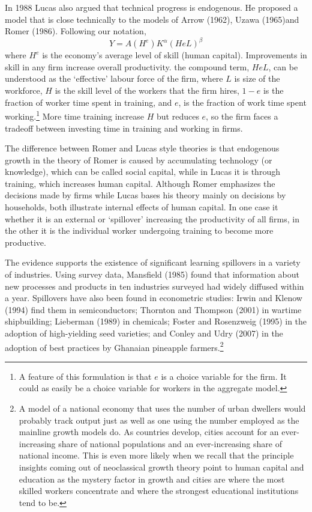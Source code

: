 In 1988 Lucas also argued that technical progress is endogenous. He proposed a model that is  close technically to the models of Arrow (1962), Uzawa (1965)and Romer (1986). Following our notation, 
\[ Y = A(H^e) K^\alpha (HeL)^\beta \] 
where $H^e$ is the economy's average level of skill (human capital).  Improvements in skill in any firm  increase overall productivity.  the compound term, $HeL$,  can be understood as the `effective' labour force of the firm, where $L$ is size of the workforce, $H$ is the skill level of the  workers that the firm hires,  $1-e$ is the fraction of worker time  spent in training, and $e$, is the fraction of work time spent working.\footnote{A feature of this formulation is that $e$ is a choice variable for the firm. It could as easily be a choice variable for workers in the aggregate model.} 
More time training increase $H$ but reduces $e$, so the firm faces a tradeoff between investing time in training and working in firms.

The difference between Romer and Lucas style theories is that endogenous growth in the theory of Romer is caused by accumulating technology (or knowledge), which can be called social capital, while in Lucas it is through training, which increases human capital. %
Although Romer emphasizes the decisions made by firms while Lucas bases his theory mainly on  decisions by households, both illustrate internal effects of human capital. In one case it whether it is an external or `spillover' increasing the productivity of all firms, in the other it is the individual worker undergoing training to become more productive. 

The evidence supports the existence of significant learning spillovers in a variety of industries. Using survey data, Mansfield (1985) found that information about new processes and products in ten industries surveyed had widely diffused within a year. Spillovers have also been found in econometric studies: Irwin and Klenow (1994) find them in semiconductors; Thornton and Thompson (2001) in wartime shipbuilding; Lieberman (1989) in chemicals; Foster and Rosenzweig (1995) in the adoption of high-yielding seed varieties; and Conley and Udry (2007) in the adoption of best practices by Ghanaian pineapple farmers.\footnote{A model of a national economy that uses the number of urban dwellers would probably track output just as well as one using the number employed as the mainline growth models do. As countries develop, cities account for an ever-increasing share of  national populations and an ever-increasing share of national income.  This is  even more likely when we recall that the principle insights coming out of neoclassical growth theory point to human capital and education as the mystery factor in growth and cities are where the most skilled workers concentrate and where the strongest educational institutions tend to be.} 


